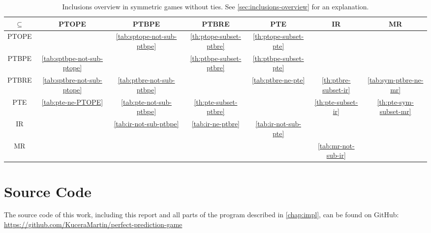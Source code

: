 \begin{sidewaystable}
	\caption{Inclusions overview in symmetric games without ties. See \autoref{sec:inclusions-overview} for an explanation.}
	\label{tab:overview-sym-nodup}
	\begin{tabular}{|c|c|c|c|c|c|c|}
		\hline
		$\subseteq$  & PTOPE & PTBPE & PTBRE & PTE & IR & MR \\
		\hline
		PTOPE & \cellcolor{gray!30} & \cellcolor{red!30} \autoref{tab:sptope-not-sub-ptbpe} & \cellcolor{green!30} \autoref{th:ptope-subset-ptbre} & \cellcolor{green!30} \autoref{th:ptope-subset-pte} & \cellcolor{green!15} & \cellcolor{green!15} \\
		\hline
		PTBPE & \cellcolor{red!30} \autoref{tab:sptbpe-not-sub-ptope} & \cellcolor{gray!30} & \cellcolor{green!30} \autoref{th:ptbpe-subset-ptbre} & \cellcolor{green!30} \autoref{th:ptbpe-subset-pte} & \cellcolor{green!15} & \cellcolor{green!15} \\
		\hline
		PTBRE & \cellcolor{red!30} \autoref{tab:sptbre-not-sub-ptope} & \cellcolor{red!30} \autoref{tab:ptbre-not-sub-ptbpe} & \cellcolor{gray!30} & \cellcolor{red!30} \autoref{tab:ptbre-ne-pte} & \cellcolor{green!30} \autoref{th:ptbre-subset-ir} & \cellcolor{red!30} \autoref{tab:sym-ptbre-ne-mr} \\
		\hline
		PTE & \cellcolor{red!30} \autoref{tab:pte-ne-PTOPE} & \cellcolor{red!30} \autoref{tab:pte-not-sub-ptbpe} & \cellcolor{green!30} \autoref{th:pte-subset-ptbre} & \cellcolor{gray!30} & \cellcolor{green!30} \autoref{th:pte-subset-ir} & \cellcolor{green!30} \autoref{th:pte-sym-subset-mr} \\
		\hline
		IR & \cellcolor{red!15} & \cellcolor{red!30} \autoref{tab:ir-not-sub-ptbpe} & \cellcolor{red!30} \autoref{tab:ir-ne-ptbre} & \cellcolor{red!30} \autoref{tab:ir-not-sub-pte} & \cellcolor{gray!30} & \cellcolor{red!15} \\
		\hline
		MR & \cellcolor{red!15} & \cellcolor{red!15} & \cellcolor{red!15} & \cellcolor{red!15} & \cellcolor{red!30} \autoref{tab:mr-not-sub-ir} & \cellcolor{gray!30} \\
		\hline
		\end{tabular}
\end{sidewaystable}


\section{Source Code}
The source code of this work, including this report and all parts of the program described in \autoref{chap:impl}, can be found on GitHub: \url{https://github.com/KuceraMartin/perfect-prediction-game}
